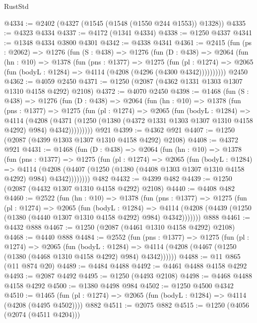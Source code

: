 \begin{lexlean}{RustStd}
\begin{coremodule}
{\begin{coremodule}
{{{{{{{{{{{{{@4334 := @2402 (@4327 (@1545 (@1548 (@1550 @244 @1553)) @1328))
@4335 := @4323 @4334
@4337 := @4172 (@1341 @4334)
@4338 := @1250 @4337
@4341 := @1348 @4334 @3800 @4301
@4342 := @4338 @4341
@4361 := @2415
    (fun (ps : @2062) =>
    @1276
      (fun (S : @438) =>
      @1276
        (fun (D : @438) =>
        @2064
          (fun (hn : @10) =>
          @1378
            (fun (pns : @1377) =>
            @1275
              (fun (pl : @1274) =>
              @2065 (fun (bodyL : @1284) => @4114 (@4208 (@4296 (@4300 @4342))))))))))
    @2450
@4362 := @4059 @2450
@4371 := @1250 (@2087 (@4362 @1331 @1303 @1307 @1310 @4158 @4292) @2108)
@4372 := @4070 @2450
@4398 := @1468
    (fun (S : @438) =>
    @1276
      (fun (D : @438) =>
      @2064
        (fun (hn : @10) =>
        @1378
          (fun (pns : @1377) =>
          @1275
            (fun (pl : @1274) =>
            @2065
              (fun (bodyL : @1284) =>
              @4114
                (@4208
                  (@4371
                    (@1250 (@1380 (@4372 @1331 @1303 @1307 @1310 @4158 @4292) @984) @4342)))))))))
    @921
@4399 := @4362 @921
@4407 := @1250 (@2087 (@4399 @1303 @1307 @1310 @4158 @4292) @2108)
@4408 := @4372 @921
@4431 := @1468
    (fun (D : @438) =>
    @2064
      (fun (hn : @10) =>
      @1378
        (fun (pns : @1377) =>
        @1275
          (fun (pl : @1274) =>
          @2065
            (fun (bodyL : @1284) =>
            @4114
              (@4208 (@4407 (@1250 (@1380 (@4408 @1303 @1307 @1310 @4158 @4292) @984) @4342))))))))
    @482
@4432 := @4399 @482
@4439 := @1250 (@2087 (@4432 @1307 @1310 @4158 @4292) @2108)
@4440 := @4408 @482
@4460 := @2522
    (fun (hn : @10) =>
    @1378
      (fun (pns : @1377) =>
      @1275
        (fun (pl : @1274) =>
        @2065
          (fun (bodyL : @1284) =>
          @4114 (@4208 (@4439 (@1250 (@1380 (@4440 @1307 @1310 @4158 @4292) @984) @4342)))))))
    @888
@4461 := @4432 @888
@4467 := @1250 (@2087 (@4461 @1310 @4158 @4292) @2108)
@4468 := @4440 @888
@4484 := @2552
    (fun (pns : @1377) =>
    @1275
      (fun (pl : @1274) =>
      @2065
        (fun (bodyL : @1284) =>
        @4114 (@4208 (@4467 (@1250 (@1380 (@4468 @1310 @4158 @4292) @984) @4342))))))
@4488 := @11 @865 (@11 @874 @20)
@4489 := @4484 @4488
@4492 := @4461 @4488 @4158 @4292
@4493 := @2087 @4492
@4495 := @1250 (@4493 @2108)
@4498 := @4468 @4488 @4158 @4292
@4500 := @1380 @4498 @984
@4502 := @1250 @4500 @4342
@4510 := @1465 (fun (pl : @1274) => @2065 (fun (bodyL : @1284) => @4114 (@4208 (@4495 @4502)))) @882
@4511 := @2075 @882
@4515 := @1250 (@4056 (@2074 (@4511 @4204)))
}}}}}}}}}}}}}
\end{coremodule}}
\end{coremodule}
\end{lexlean}
